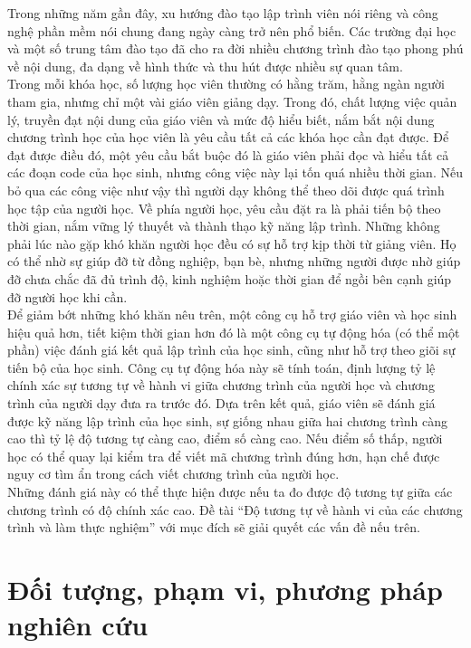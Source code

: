 Trong những năm gần đây, xu hướng đào tạo lập trình viên nói riêng và công nghệ phần mềm nói chung đang ngày càng trở nên phổ biến. Các trường đại học và một số trung tâm đào tạo đã cho ra đời nhiều chương trình đào tạo phong phú về nội dung, đa dạng về hình thức và thu hút được nhiều sự quan tâm.\\

Trong mỗi khóa học, số lượng học viên thường có hằng trăm, hằng ngàn người tham gia, nhưng chỉ một vài giáo viên giảng dạy. Trong đó, chất lượng việc quản lý, truyền đạt nội dung của giáo viên và mức độ hiểu biết, nắm bắt nội dung chương trình học của học viên là yêu cầu tất cả các khóa học cần đạt được. Để đạt được điều đó, một yêu cầu bắt buộc đó là giáo viên phải đọc và hiểu tất cả các đoạn code của học sinh, nhưng công việc này lại tốn quá nhiều thời gian. Nếu bỏ qua các công việc như vậy thì người dạy không thể theo dõi được quá trình học tập của người học. Về phía người học, yêu cầu đặt ra là phải tiến bộ theo thời gian, nắm vững lý thuyết và thành thạo kỹ năng lập trình. Những không phải lúc nào gặp khó khăn người học đều có sự hỗ trợ kịp thời từ giảng viên. Họ có thể nhờ sự giúp đỡ từ đồng nghiệp, bạn bè, nhưng những người được nhờ giúp đỡ chưa chắc đã đủ trình độ, kinh nghiệm hoặc thời gian để ngồi bên cạnh giúp đỡ người học khi cần.\\

Để giảm bớt những khó khăn nêu trên, một công cụ hỗ trợ giáo viên và học sinh hiệu quả hơn, tiết kiệm thời gian hơn đó là một công cụ tự động hóa (có thể một phần) việc đánh giá kết quả lập trình của học sinh, cũng như hỗ trợ theo giõi sự tiến bộ của học sinh. Công cụ tự động hóa này sẽ tính toán, định lượng tỷ lệ chính xác sự tương tự về hành vi giữa chương trình của người học và chương trình của người dạy đưa ra trước đó. Dựa trên kết quả, giáo viên sẽ đánh giá được kỹ năng lập trình của học sinh, sự giống nhau giữa hai chương trình càng cao thì tỷ lệ độ tương tự càng cao, điểm số càng cao. Nếu điểm số thấp, người học có thể quay lại kiểm tra để viết mã chương trình đúng hơn, hạn chế được nguy cơ tìm ẩn trong cách viết chương trình của người học.\\

Những đánh giá này có thể thực hiện được nếu ta đo được độ tương tự giữa các chương trình có độ chính xác cao. Đề tài “Độ tương tự về hành vi của các chương trình và làm thực nghiệm” với mục đích sẽ giải quyết các vấn đề nếu trên.

\section{Đối tượng, phạm vi, phương pháp nghiên cứu}

